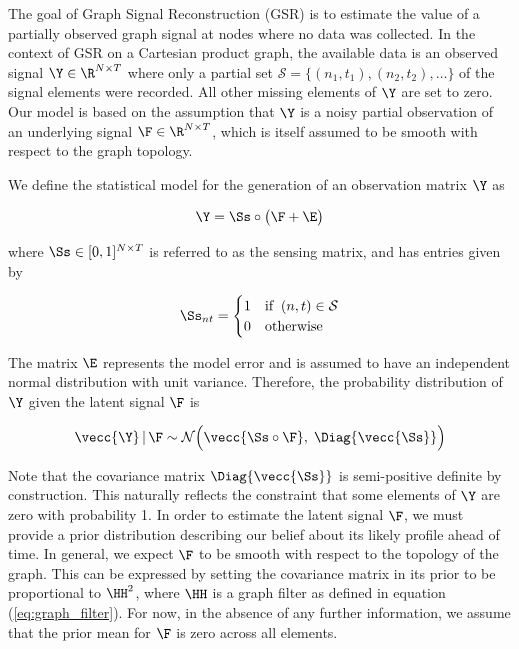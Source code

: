 The goal of Graph Signal Reconstruction (GSR) is to estimate the value of a partially observed graph signal at nodes where no data was collected. In the context of GSR on a Cartesian product graph, the available data is an observed signal $\Y \in \R^{N \times T}$ where only a partial set $\mathcal{S} = \{(n_1, t_1), (n_2, t_2), \dots \}$ of the signal elements were recorded. All other missing elements of $\Y$ are set to zero. Our model is based on the assumption that $\Y$ is a noisy partial observation of an underlying signal $\F \in \R^{N \times T}$, which is itself assumed to be smooth with respect to the graph topology.

We define the statistical model for the generation of an observation matrix $\Y$ as

\begin{equation}
    \Y = \Ss \circ \big(\F + \E \big)
\end{equation}

where $\Ss \in [0, 1]^{N \times T}$ is referred to as the sensing matrix, and has entries given by

\begin{equation}
    \Ss_{nt} = \begin{cases}
        1 & \text{if} \;\; (n, t) \in \mathcal{S} \\
        0 & \text{otherwise}
    \end{cases}
\end{equation}

The matrix $\E$ represents the model error and is assumed to have an independent normal distribution with unit variance. Therefore, the probability distribution of $\Y$ given the latent signal $\F$ is

\begin{equation}
    \label{eq:Y_given_F}
    \vecc{\Y} \, | \, \F \sim \mathcal{N}\Big(\vecc{\Ss \circ \F}, \; \Diag{\vecc{\Ss}}\Big)
\end{equation}

Note that the covariance matrix $\Diag{\vecc{\Ss}}$ is semi-positive definite by construction. This naturally reflects the constraint that some elements of $\Y$ are zero with probability 1. In order to estimate the latent signal $\F$, we must provide a prior distribution describing our belief about its likely profile ahead of time. In general, we expect $\F$ to be smooth with respect to the topology of the graph. This can be expressed by setting the covariance matrix in its prior to be proportional to $\HH^2$, where $\HH$ is a graph filter as defined in equation (\ref{eq:graph_filter}). For now, in the absence of any further information, we assume that the prior mean for $\F$ is zero across all elements.

